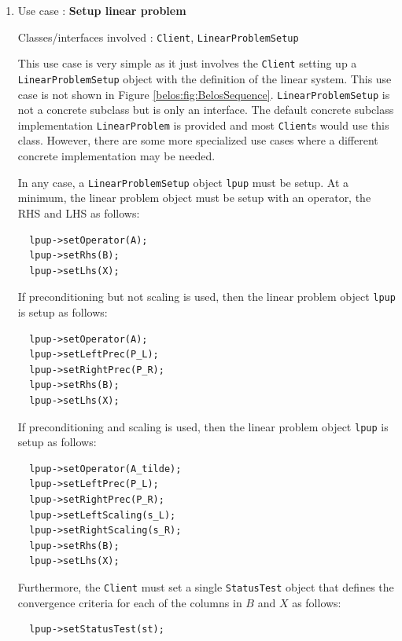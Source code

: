 \documentclass[pdf,ps2pdf,11pt]{SANDreport}
\begin{document}
\begin{enumerate}

\item Use case : \textbf{Setup linear problem}

{}\noindent{}Classes/interfaces involved : {}\texttt{Client},
{}\texttt{Linear\-Problem\-Setup}

This use case is very simple as it just involves the {}\texttt{Client}
setting up a {}\texttt{Linear\-Problem\-Setup} object with the
definition of the linear system.  This use case is not shown in Figure
{}\ref{belos:fig:BelosSequence}.  {}\texttt{Linear\-Problem\-Setup} is
not a concrete subclass but is only an interface.  The default
concrete subclass implementation {}\texttt{Linear\-Problem} is
provided and most {}\texttt{Client}s would use this class.  However,
there are some more specialized use cases where a different concrete
implementation may be needed.

In any case, a {}\texttt{Linear\-Problem\-Setup} object
{}\texttt{lpup} must be setup.  At a minimum, the linear problem
object must be setup with an operator, the RHS and LHS as follows:

{\scriptsize\begin{verbatim}
  lpup->setOperator(A);
  lpup->setRhs(B);
  lpup->setLhs(X);
\end{verbatim}}

If preconditioning but not scaling is used, then the linear problem
object {}\texttt{lpup} is setup as follows:

{\scriptsize\begin{verbatim}
  lpup->setOperator(A);
  lpup->setLeftPrec(P_L);
  lpup->setRightPrec(P_R);
  lpup->setRhs(B);
  lpup->setLhs(X);
\end{verbatim}}

If preconditioning and scaling is used, then the linear problem object
{}\texttt{lpup} is setup as follows:

{\scriptsize\begin{verbatim}
  lpup->setOperator(A_tilde);
  lpup->setLeftPrec(P_L);
  lpup->setRightPrec(P_R);
  lpup->setLeftScaling(s_L);
  lpup->setRightScaling(s_R);
  lpup->setRhs(B);
  lpup->setLhs(X);
\end{verbatim}}

Furthermore, the {}\texttt{Client} must set a single
{}\texttt{Status\-Test} object that defines the convergence criteria
for each of the columns in $B$ and $X$ as follows:

{\scriptsize\begin{verbatim}
  lpup->setStatusTest(st);
\end{verbatim}}


\end{enumerate}
\end{document}
